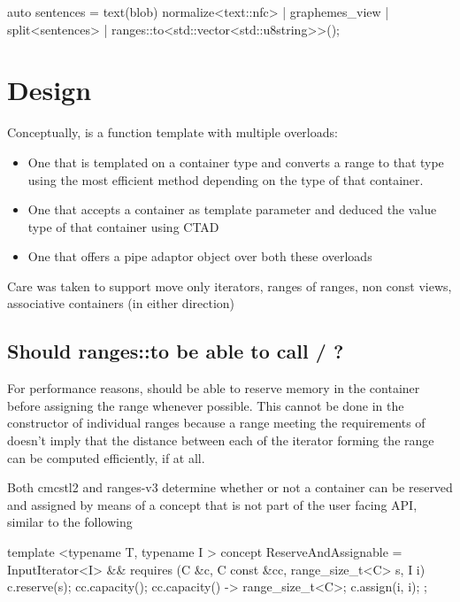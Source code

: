 \documentclass{wg21}
\begin{document}
\begin{colorblock}
    auto sentences =
        text(blob)
        normalize<text::nfc> |
        graphemes_view |
        split<sentences> | ranges::to<std::vector<std::u8string>>();
\end{colorblock}


\section{Design}

Conceptually,  is a function template with multiple overloads:
\begin{itemize}
    \item One that is templated on a container type and converts a range to that type using the most efficient method depending on the type of that container.
    \item One that accepts a container as template parameter and deduced the value type of that container using CTAD
    \item One that offers a pipe adaptor object over both these overloads
\end{itemize}

Care was taken to support move only iterators, ranges of ranges, non const views, associative containers (in either direction)


\subsection{Should ranges::to be able to call / ?}

For performance reasons,  should be able to reserve memory in the container before assigning the range whenever possible.
This cannot be done in the constructor of individual ranges because a range meeting the requirements of  
doesn't imply that the distance between each of the iterator forming the range can be computed efficiently, if at all. 

Both cmcstl2 and ranges-v3 determine whether or not a container can be reserved and assigned by means of a  concept that is not part of the user facing API, similar to the following


\begin{colorblock}
template <typename T, typename I >
concept ReserveAndAssignable = 
	InputIterator<I> && requires (C &c, C const &cc, range_size_t<C> s, I i) {
		c.reserve(s);
		cc.capacity();
		{ cc.capacity() } -> range_size_t<C>;
		c.assign(i, i);
};
\end{colorblock}
\end{document}
